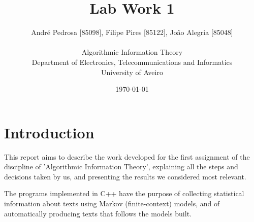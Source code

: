 \documentclass[12pt]{article}
\title{Lab Work 1}
\author
{André Pedrosa [85098], Filipe Pires [85122], João Alegria [85048]\\
\\
Algorithmic Information Theory\\
\normalsize{Department of Electronics, Telecommunications and Informatics}\\
\normalsize{University of Aveiro}\\
}
\date{\today{}}
\newenvironment{sciabstract}{%
\begin{quote} \bf}
{\end{quote}}
\begin{document}
 


\baselineskip18pt


\maketitle 


  


\section*{Introduction}

This report aims to describe the work developed for the first assignment
of the discipline of 'Algorithmic Information Theory', explaining all the 
steps and decisions taken by us, and presenting the results we considered 
most relevant.

The programs implemented in C++ have the purpose of collecting statistical
information about texts using Markov (finite-context) models, and of 
automatically producing texts that follows the models built.
\end{document}
